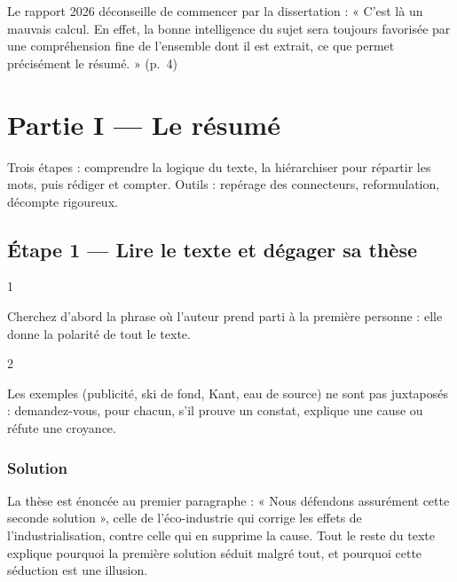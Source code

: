 \documentclass[11pt,a4paper]{article}
\begin{document}
\begin{jury}

Le rapport 2026 déconseille de commencer par la dissertation : « C'est là un mauvais calcul. En effet, la bonne intelligence du sujet sera toujours favorisée par une compréhension fine de l'ensemble dont il est extrait, ce que permet précisément le résumé. » (p.~4)

\end{jury}

\hypertarget{partie-i-le-ruxe9sumuxe9}{%
\section{Partie I --- Le résumé}\label{partie-i-le-ruxe9sumuxe9}}

Trois étapes : comprendre la logique du texte, la hiérarchiser pour répartir les mots, puis rédiger et compter. Outils : repérage des connecteurs, reformulation, décompte rigoureux.

\hypertarget{uxe9tape-1-lire-le-texte-et-duxe9gager-sa-thuxe8se}{%
\subsection{Étape 1 --- Lire le texte et dégager sa thèse}\label{uxe9tape-1-lire-le-texte-et-duxe9gager-sa-thuxe8se}}

\begin{indication}{1}

Cherchez d'abord la phrase où l'auteur prend parti à la première personne : elle donne la polarité de tout le texte.

\end{indication}

\begin{indication}{2}

Les exemples (publicité, ski de fond, Kant, eau de source) ne sont pas juxtaposés : demandez-vous, pour chacun, s'il prouve un constat, explique une cause ou réfute une croyance.

\end{indication}

\hypertarget{solution}{%
\subsubsection{Solution}\label{solution}}

La thèse est énoncée au premier paragraphe : « Nous défendons assurément cette seconde solution », celle de l'éco-industrie qui corrige les effets de l'industrialisation, contre celle qui en supprime la cause. Tout le reste du texte explique pourquoi la première solution séduit malgré tout, et pourquoi cette séduction est une illusion.
\end{document}
